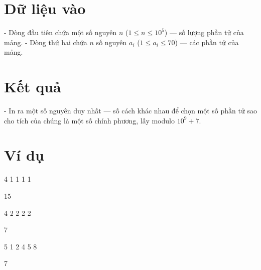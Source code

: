 \documentclass[12pt,a4paper]{article}
\begin{document}
\section*{Dữ liệu vào}
- Dòng đầu tiên chứa một số nguyên $n$ ($1 \le n \le 10^5$) — số lượng phần tử của mảng.
- Dòng thứ hai chứa $n$ số nguyên $a_i$ ($1 \le a_i \le 70$) — các phần tử của mảng.

\section*{Kết quả}
- In ra một số nguyên duy nhất — số cách khác nhau để chọn một số phần tử sao cho tích của chúng là một số chính phương, lấy modulo $10^9+7$.

\section*{Ví dụ}


\begin{inputbox}4
1 1 1 1
\end{inputbox}
\begin{outputbox}15
\end{outputbox}


\begin{inputbox}4
2 2 2 2
\end{inputbox}
\begin{outputbox}7
\end{outputbox}


\begin{inputbox}5
1 2 4 5 8
\end{inputbox}
\begin{outputbox}7
\end{outputbox}
\end{document}
